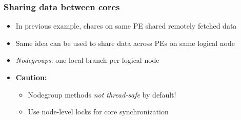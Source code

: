\begin{frame}[fragile]
  \frametitle{Sharing data between cores}
  \begin{itemize}
    \item In previous example, chares on same PE shared remotely fetched data
    \item Same idea can be used to share data across PEs on same logical node
    \item {\em Nodegroups}: one local branch per logical node
    \item {\bf Caution:}
    \begin{itemize}
      \item Nodegroup methods {\em not thread-safe} by default! 
      \item Use node-level locks for core synchronization
    \end{itemize}
  \end{itemize}
\end{frame}
